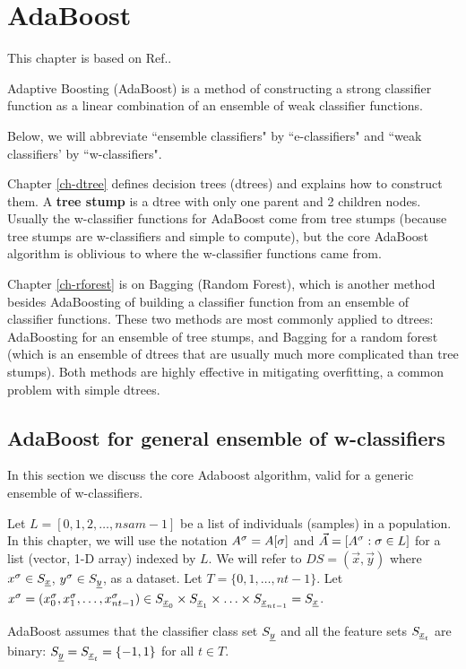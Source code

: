 \chapter{AdaBoost}
\label{ch-adaboost}

This chapter
is based on Ref.\cite{wiki-adaboost}.


Adaptive Boosting (AdaBoost) is 
a method of constructing
a strong
classifier function
as a linear 
combination
of an ensemble
of weak classifier
functions.

Below,
we will abbreviate
``ensemble classifiers" by ``e-classifiers"
and ``weak classifiers' by ``w-classifiers".


Chapter \ref{ch-dtree}
defines decision trees (dtrees)
and explains how to construct them.
A
{\bf tree stump}
is a dtree  with only one
parent and 2 children nodes.
Usually the 
w-classifier functions
for AdaBoost
come from tree stumps
(because tree stumps
are w-classifiers
and simple to compute), but
the core
AdaBoost algorithm
is oblivious to 
where the w-classifier functions came from.


Chapter \ref{ch-rforest}
is on Bagging (Random Forest),
which is 
another method
besides AdaBoosting
of building a classifier function
from an ensemble 
of classifier functions.
These two methods are most commonly
applied to dtrees: AdaBoosting for an ensemble of
tree stumps, and Bagging for a random 
forest (which
is an ensemble
of dtrees that are usually much more
complicated than tree stumps). Both methods 
 are highly effective
in mitigating overfitting,
a common problem with simple
dtrees.


\section{AdaBoost for general ensemble
of w-classifiers}
In this 
section 
we discuss the core Adaboost
algorithm,
valid for a generic ensemble of w-classifiers.

Let $L=[0,1,2, \ldots, nsam-1]$ be a list of
individuals (samples) in a population.
In this chapter, we will use the notation 
$A^\sigma=A[\sigma]$ 
and $\vec{A}=[A^\sigma:\sigma\in L]$
for a  list (vector, 1-D  array) indexed by $L$.
We will refer to $DS=(\vec{x}, \vec{y})$ 
where $x^\sigma\in S_{\underline{x}}$, $y^\sigma\in S_{\underline{y}}$,
as a dataset. 
Let $T=\{0,1, \dots, nt-1\}$.
Let
$x^\sigma=(x^\sigma_0, x^\sigma_1, \ldots, x^\sigma_{nt-1})
\in S_{{\underline{x}}_0}\times S_{{\underline{x}}_1}
\times\ldots\times
 S_{{\underline{x}}_{nt-1}}=S_{\underline{x}}$.

AdaBoost assumes
that the classifier class set
$S_{\underline{y}}$  and
all the feature sets $S_{{\underline{x}}_t}$ 
are
binary:
$S_{\underline{y}}=S_{{\underline{x}}_t}=\{-1, 1\}$ for 
all $t\in T$.


